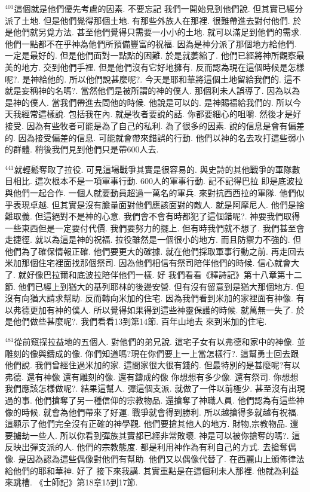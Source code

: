 \documentclass{book}
\begin{document}
$^{401}$這個就是他們優先考慮的因素.
不要忘記 我們一開始見到他們說.
但其實已經分派了土地.
但是他們覺得那個土地.
有那些外族人在那裡.
很難帶進去對付他們.
於是他們就另覓方法.
甚至他們覺得只需要一小小的土地.
就可以滿足到他們的需求.
他們一點都不在乎神為他們所預備豐富的祝福.
因為是神分派了那個地方給他們.
一定是最好的.
但是他們面對一點點的困難.
於是就萎縮了.
他們已經將神所觀察最美的地方.
交到他們手裡.
但是他們沒有它好地擁有.
反而認為現在這個時候是怎樣呢?.
是神給他的.
所以他們說甚麼呢?.
今天是耶和華將這個土地留給我們的.
這不就是妄稱神的名嗎?.
當然他們是被所謂的神的僕人.
那個利未人誤導了.
因為以為是神的僕人.
當我們帶進去問他的時候.
他說是可以的.
是神賜福給我們的.
所以今天我經常這樣說.
包括我在內.
就是牧者要說的話.
你都要細心的咀嚼.
然後才是好接受.
因為有些牧者可能是為了自己的私利.
為了很多的因素.
說的信息是會有偏差的.
因為接受偏差的信息.
可能就會帶來錯誤的行動.
他們以神的名去攻打這些弱小的群體.
稍後我們見到他們只是帶600人去.

$^{441}$就輕鬆奪取了拉役.
可見這場戰爭其實是很容易的.
與史詩的其他戰爭的軍隊數目相比.
這次根本不是一項軍事行動.
600人的軍事行動.
記不記得巴拉 即是底波拉與他們一起合作.
一個人就要動員超過一萬名的軍兵.
來對抗西西拉的軍隊.
他們似乎表現卓越.
但其實是沒有膽量面對他們應該面對的敵人.
就是阿摩尼人.
他們是捨難取義.
但這絕對不是神的心意.
我們會不會有時都犯了這個錯呢?.
神要我們取得一些東西但是一定要付代價.
我們要努力的擺上.
但有時我們就不想了.
我們甚至會走捷徑.
就以為這是神的祝福.
拉役雖然是一個很小的地方.
而且防禦力不強的.
但他們為了確保情報正確.
他們要更大的確據.
就在他們採取軍事行動之前.
再走回去米加那個住宅裡面找那個祭司.
因為他們相信有祭司陪伴他們的時候.
信心就會大了.
就好像巴拉爾和底波拉陪伴他們一樣.
好 我們看看《釋詩記》第十八章第十二節.
他們已經上到猶大的基列耶林的後邊安營.
但有沒有留意到是猶大那個地方.
但沒有向猶大請求幫助.
反而轉向米加的住宅.
因為我們看到米加的家裡面有神像.
有以弗德更加有神的僕人.
所以覺得如果得到這些神靈保護的時候.
就萬無一失了.
於是他們做些甚麼呢?.
我們看看13到第14節.
百年山地去 來到米加的住宅.

$^{481}$從前窺探拉益地的五個人.
對他們的弟兄說.
這宅子女有以弗德和家中的神像.
並雕刻的像與鑄成的像.
你們知道嗎?現在你們要上一上當怎樣行?.
這幫勇士回去跟他們說.
我們曾經住過米加的家.
這間家很大很有錢的.
但最特別的是甚麼呢?有以弗德.
還有神像 還有雕刻的像.
還有鑄成的像 你想想有多少像.
還有祭司.
你想想 我們應該怎樣做呢?.
結果這幫人.
彈這個支派.
就做了一件以前極少.
甚至沒有出現過的事.
他們搶奪了另一種信仰的宗教物品.
還搶奪了神職人員.
他們認為有這些神像的時候.
就會為他們帶來了好運.
戰爭就會得到勝利.
所以越搶得多就越有祝福.
這顯示了他們完全沒有正確的神學觀.
他們要搶其他人的地方.
財物,宗教物品.
還要擄劫一些人.
所以你看到彈族其實都已經非常敗壞.
神是可以被你搶奪的嗎?.
這反映出彈支派的人.
他們的宗教態度.
都是利用神作為有利自己的方式.
去搶奪偶像.
是因為認為這些偶像對他們有幫助.
他們又以偶像代替了.
在西麗山上頒佈律法給他們的耶和華神.
好了 接下來我講.
其實重點是在這個利未人那裡.
他就為利益來跳槽.
《士師記》第18章15到17節.
\end{document}

